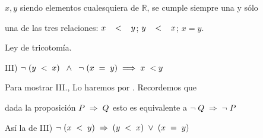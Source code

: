 \documentclass[12pt]{article}
\begin{document}
$x,y$ siendo elementos cualesquiera de $\mathbb{R}$, se cumple siempre una y sólo \par una de las tres relaciones: $x\hspace{0.3cm}<\hspace{0.3cm}y$; \hspace{0.3cm}$y\hspace{0.3cm}<\hspace{0.3cm}x$;\hspace{0.3cm} $x=y$. \vspace{0.2cm} \vspace{0.2cm}

Ley de tricotomía. \vspace{0.3cm}

III) $\neg \hspace{0.1cm}(y\hspace{0.1cm}<\hspace{0.1cm}x) \hspace{0.2cm}\wedge\hspace{0.2cm}\neg \hspace{0.1cm}(x\hspace{0.1cm}=\hspace{0.1cm}y)\hspace{0.1cm}\Longrightarrow \hspace{0.1cm} x\hspace{0.1cm}<y$ \vspace{0.5cm}

{} Para mostrar III., Lo haremos por {}. Recordemos que \par dada la proposición \hspace{0.2cm} $P\hspace{0.1cm}\Rightarrow \hspace{0.1cm}Q$ esto es equivalente a $\neg\hspace{0.1cm} Q\hspace{0.1cm}\Rightarrow\hspace{0.1cm}\neg\hspace{0.1cm}P$ \vspace{0.5cm}

Así la {} de III) \hspace{0.1cm} $\neg\hspace{0.1cm}(x\hspace{0.1cm}<\hspace{0.1cm}y)\hspace{0.1cm}\Rightarrow\hspace{0.1cm}(y\hspace{0.1cm}<\hspace{0.1cm}x)\hspace{0.1cm}\vee\hspace{0.1cm}(x\hspace{0.1cm}=\hspace{0.1cm}y)$ \vspace{0.5cm}
\end{document}
